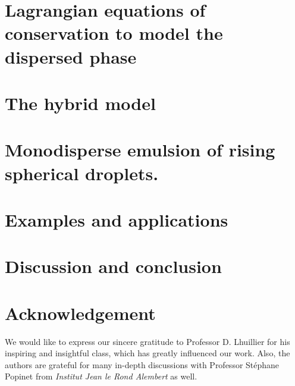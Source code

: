 \documentclass[12pt]{My_preprint}
\begin{document}
\section{Lagrangian equations of conservation to model the dispersed phase}
\label{sec:Lagrangian}


\section{The hybrid model}
\label{sec:averaged_eq}






\section{Monodisperse emulsion of rising spherical droplets.}
\label{sec:Exemples}
 





\section{Examples and applications}






\section{Discussion and conclusion}


\section*{Acknowledgement}
We would like to express our sincere gratitude to Professor D. Lhuillier for his inspiring and insightful class, which has greatly influenced our work.
Also, the authors are grateful for many in-depth discussions with Professor St\'ephane Popinet from \textit{Institut Jean le Rond Alembert} as well. 




\appendix





\end{document}
